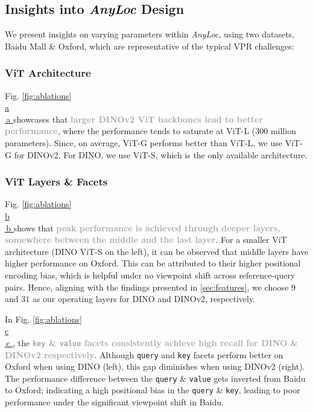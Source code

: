 \documentclass[letterpaper, 10 pt, conference]{ieeeconf}  \fi
\newcommand{\highlight}[1]{\textcolor{darkgray}{\textbf{#1}}}
\newcommand*{\subfigref}[2][]{Fig. \hyperref[{fig:#2}]{\ref*{fig:#2}\ifx\\#1\\\else
      \,#1\fi
  }}
\newcommand{\coolname}{\textit{AnyLoc}}
\newcommand{\dino}{\mbox{DINO}}
\newcommand{\dinovtwo}{\mbox{DINOv2}}
\begin{document}
\subsection{Insights into \coolname{} Design}
We present insights on varying parameters within \coolname{}, using two datasets, Baidu Mall \& Oxford, which are representative of the typical VPR challenges:


\subsubsection{ViT Architecture}

\subfigref[a]{ablations} showcases that \highlight{larger \dinovtwo{} ViT backbones lead to better performance}, where the performance tends to saturate at ViT-L (300 million parameters). 
Since, on average, ViT-G performs better than ViT-L, we use ViT-G for \dinovtwo{}.
For \dino{}, we use ViT-S, which is the only available architecture.


\subsubsection{ViT Layers \& Facets}
\label{sec:facets_and_layers}

\subfigref[b]{ablations} shows that \highlight{peak performance is achieved through deeper layers, somewhere between the middle and the last layer}. 
For a smaller ViT architecture (\dino{} ViT-S on the left), it can be observed that middle layers have higher performance on Oxford.
This can be attributed to their higher positional encoding bias, which is helpful under no viewpoint shift across reference-query pairs. 
Hence, aligning with the findings presented in \cref{sec:features}, we choose $9$ and $31$ as our operating layers for \dino{} and \dinovtwo{}, respectively.


In \subfigref[c]{ablations}, the \highlight{\texttt{key} \& \texttt{value} facets consistently achieve high recall for \dino{} \& \dinovtwo{} respectively}.
Although \texttt{query} and \texttt{key} facets perform better on Oxford when using \dino{} (left), this gap diminishes when using \dinovtwo{} (right).  
The performance difference between the \texttt{query} \& \texttt{value} gets inverted from Baidu to Oxford; indicating a high positional bias in the \texttt{query} \& \texttt{key}, leading to poor performance under the significant viewpoint shift in Baidu.
\end{document}
